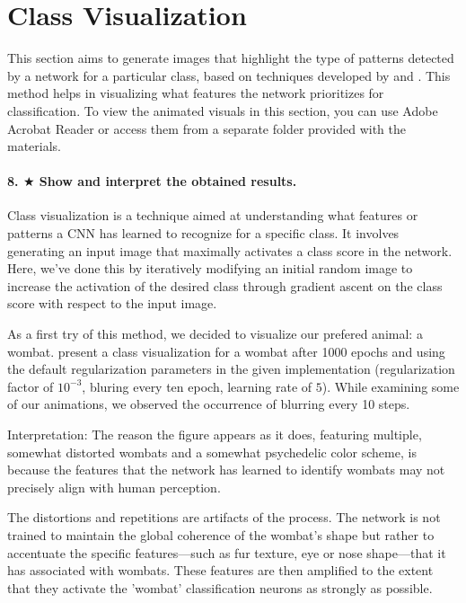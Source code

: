 \section{Class Visualization}

This section aims to generate images that highlight the type of patterns detected by a network for a particular class, based on techniques developed by \cite{simonyan2014deep} and \cite{yosinski2015understanding}. This method helps in visualizing what features the network prioritizes for classification. To view the animated visuals in this section, you can use Adobe Acrobat Reader or access them from a separate folder provided with the materials.

\paragraph*{8. $ \bigstar $ Show and interpret the obtained results.}
Class visualization is a technique aimed at understanding what features or patterns a CNN has learned to recognize for a specific class. It involves generating an input image that maximally activates a class score in the network. Here, we've done this by iteratively modifying an initial random image to increase the activation of the desired class through gradient ascent on the class score with respect to the input image.

As a first try of this method, we decided to visualize our prefered animal: a wombat.  present a class visualization for a wombat after 1000 epochs and using the default regularization parameters in the given implementation (regularization factor of $10^{-3}$, bluring every ten epoch, learning rate of $5$). While examining some of our animations, we observed the occurrence of blurring every 10 steps.

Interpretation: The reason the figure appears as it does, featuring multiple, somewhat distorted wombats and a somewhat psychedelic color scheme, is because the features that the network has learned to identify wombats may not precisely align with human perception.

The distortions and repetitions are artifacts of the process. The network is not trained to maintain the global coherence of the wombat's shape but rather to accentuate the specific features—such as fur texture, eye or nose shape—that it has associated with wombats. These features are then amplified to the extent that they activate the 'wombat' classification neurons as strongly as possible.

